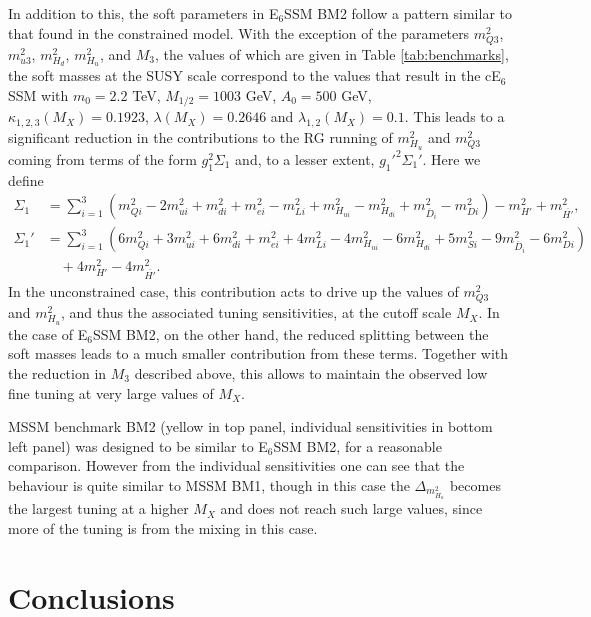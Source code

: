 \documentclass[preprint,amsmath,amssymb,aps,superscriptaddress,prd,showpacs,floatfix,nofootinbib]{revtex4-1}
\begin{document}
In addition to this, the soft parameters in E$_6$SSM BM2 follow a pattern similar to that found in the constrained
model. With the exception of the parameters $m_{Q3}^2$, 
$m_{u3}^2$, $m_{H_d}^2$, $m_{H_u}^2$, and $M_3$, the values of which are given in Table \ref{tab:benchmarks}, 
the soft masses at the SUSY scale correspond to the values that result in the cE$_6$SSM with $m_0=2.2$ TeV, 
$M_{1/2}=1003$ GeV, $A_0=500$ GeV, $\kappa_{1,2,3}(M_X)=0.1923$, $\lambda(M_X)=0.2646$ and
$\lambda_{1,2}(M_X)=0.1$. This leads to a significant reduction in the contributions to the RG running of $m_{H_u}^2$ and $m_{Q3}^2$ coming from terms of the form $g_1^2\Sigma_1$ and, to a lesser extent, $g_1'^2\Sigma_1'$. Here we define
\begin{align*}
\Sigma_1&=\sum_{i=1}^3\left ( m_{Qi}^2-2m_{ui}^2+m_{di}^2+m_{ei}^2-m_{Li}^2+m_{H_{ui}}^2-m_{H_{di}}^2+m_{\overline{D}_i}^2-m_{Di}^2\right )-m_{H'}^2+m_{\overline{H'}}^2,\\
\Sigma_1'&=\sum_{i=1}^3\left ( 6m_{Qi}^2+3m_{ui}^2+6m_{di}^2+m_{ei}^2+4m_{Li}^2-4m_{H_{ui}}^2-6m_{H_{di}}^2+5m_{Si}^2-9m_{\overline{D}_i}^2-6m_{Di}^2\right )\\
&\quad{}+4m_{H'}^2-4m_{\overline{H'}}^2.
\end{align*}
In the unconstrained case, this contribution acts to drive up the values of $m_{Q3}^2$ and $m_{H_u}^2$, and thus the associated tuning sensitivities, at the cutoff scale $M_X$. In the case of E$_6$SSM BM2, on the other hand, the reduced splitting between the soft masses leads to a much smaller contribution from these terms. Together with the reduction in $M_3$ described above, this allows to maintain the observed low fine tuning at very large values of $M_X$.

MSSM benchmark BM2 (yellow in top panel, individual sensitivities in bottom left panel) was designed to be similar to E$_6$SSM BM2, for a reasonable comparison.  However from the individual sensitivities one can see that the behaviour is quite similar to MSSM BM1, though in this case the $\Delta_{m_{H_u}^2}$ becomes the largest tuning at a higher $M_X$ and does not reach such large values, since more of the tuning is from the mixing in this case.

\section{\label{sec:conclusion}Conclusions}
\end{document}
